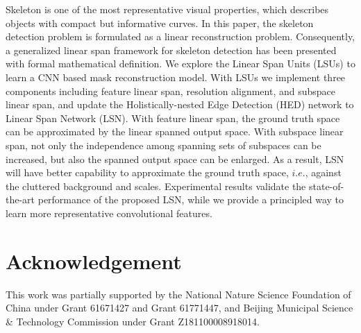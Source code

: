 \documentclass[runningheads]{llncs}
\begin{document}
Skeleton is one of the most representative visual properties, which describes objects with compact but informative curves. In this paper, the skeleton detection problem is formulated as a linear reconstruction problem. Consequently, a generalized linear span framework for skeleton detection has been presented with formal mathematical definition. We explore the Linear Span Units (LSUs) to learn a CNN based mask reconstruction model. With LSUs we implement three components including feature linear span, resolution alignment, and subspace linear span, and update the Holistically-nested Edge Detection (HED) network to Linear Span Network (LSN). With feature linear span, the ground truth space can be approximated by the linear spanned output space. With subspace linear span, not only the independence among spanning sets of subspaces can be increased, but also the spanned output space can be enlarged. As a result, LSN will have better capability to approximate the ground truth space, $i.e.$, against the cluttered background and scales. Experimental results validate the state-of-the-art performance of the proposed LSN, while we provide a principled way to learn more representative convolutional features.
\section*{Acknowledgement}
This work was partially supported by the National Nature Science Foundation of China under Grant 61671427 and Grant 61771447, and Beijing Municipal Science \& Technology Commission under Grant Z181100008918014.


\end{document}
